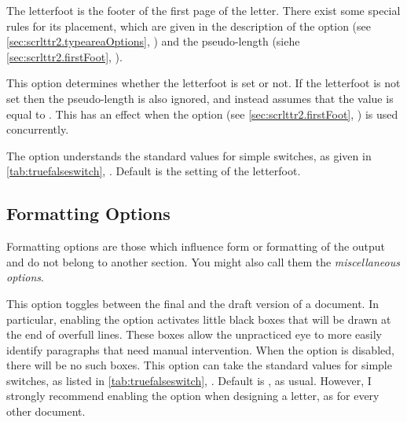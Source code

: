 The letterfoot is the footer of the first page of the letter. There
exist some special rules for its placement, which are given in the
description of the option
 (see
\autoref{sec:scrlttr2.typeareaOptions},
) and the
pseudo-length 
(siehe \autoref{sec:scrlttr2.firstFoot},
).

\begin{Declaration}
\end{Declaration}
%
This option determines whether the
letterfoot is set or not. If the letterfoot is not set then the
pseudo-length  is also ignored, and instead
 assumes that the value is equal to
.  This has an effect when the option
 (see \autoref{sec:scrlttr2.firstFoot},
) is used
concurrently.
  
The option understands the standard values for simple switches, as
given in \autoref{tab:truefalseswitch},
. Default is the setting
of the letterfoot.
%


\subsection{Formatting Options}
\label{sec:scrlttr2.formatingOptions}

Formatting options are those which influence form or formatting of the
output and do not belong to another section. You might also call them
the \emph{miscellaneous options}.

\begin{Declaration}
\end{Declaration}
%
This option toggles between the final and the
draft version of a document. In particular,
enabling the  option activates little black boxes that
will be drawn at the end of overfull lines. These boxes allow the
unpracticed eye to more easily identify paragraphs that need manual
intervention. When the  option is disabled, there will
be no such boxes. This option can take the standard values for simple
switches, as listed in \autoref{tab:truefalseswitch},
.  Default is
, as usual. However, I strongly recommend enabling the
 option when designing a letter, as for every other
document.
%
%


